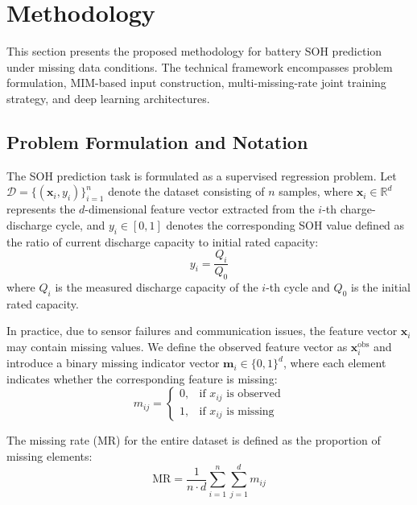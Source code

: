 \documentclass[5p,times]{elsarticle}
\begin{document}
\section{Methodology}\label{sec:method}

This section presents the proposed methodology for battery SOH prediction under missing data conditions. The technical framework encompasses problem formulation, MIM-based input construction, multi-missing-rate joint training strategy, and deep learning architectures.

\subsection{Problem Formulation and Notation}\label{sec:formulation}

The SOH prediction task is formulated as a supervised regression problem. Let $\mathcal{D} = \{(\mathbf{x}_i, y_i)\}_{i=1}^{n}$ denote the dataset consisting of $n$ samples, where $\mathbf{x}_i \in \mathbb{R}^{d}$ represents the $d$-dimensional feature vector extracted from the $i$-th charge-discharge cycle, and $y_i \in [0, 1]$ denotes the corresponding SOH value defined as the ratio of current discharge capacity to initial rated capacity:
\begin{equation}
    y_i = \frac{Q_i}{Q_0}
    \label{eq:soh}
\end{equation}
where $Q_i$ is the measured discharge capacity of the $i$-th cycle and $Q_0$ is the initial rated capacity.

In practice, due to sensor failures and communication issues, the feature vector $\mathbf{x}_i$ may contain missing values. We define the observed feature vector as $\mathbf{x}_i^{\text{obs}}$ and introduce a binary missing indicator vector $\mathbf{m}_i \in \{0, 1\}^{d}$, where each element indicates whether the corresponding feature is missing:
\begin{equation}
    m_{ij} = 
    \begin{cases}
        0, & \text{if } x_{ij} \text{ is observed} \\
        1, & \text{if } x_{ij} \text{ is missing}
    \end{cases}
    \label{eq:indicator}
\end{equation}

The missing rate (MR) for the entire dataset is defined as the proportion of missing elements:
\begin{equation}
    \text{MR} = \frac{1}{n \cdot d} \sum_{i=1}^{n} \sum_{j=1}^{d} m_{ij}
    \label{eq:mr}
\end{equation}
\end{document}
